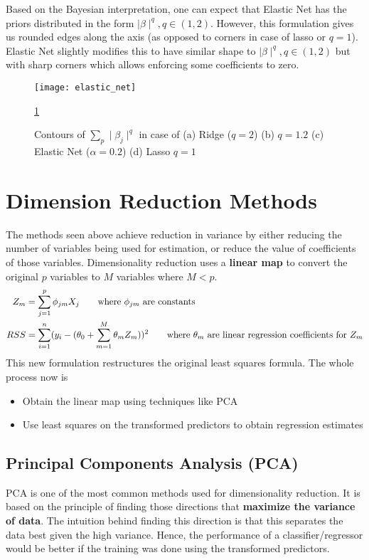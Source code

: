 \documentclass[../statistical_learning_notes.tex]{subfiles}
\begin{document}
    Based on the Bayesian interpretation, one can expect that Elastic Net has the priors distributed in the form $\mid \beta \mid ^{q}, q \in (1,2)$. However, this formulation gives us rounded edges along the axis (as opposed to corners in case of lasso or $q=1$). Elastic Net slightly modifies this to have similar shape to $\mid \beta \mid ^{q}, q \in (1,2)$ but with sharp corners which allows enforcing some coefficients to zero.


    \begin{figure}[h]
        \texttt{[image: elastic\_net]}
        \centering
        \caption {Contours of $\sum_{p} \mid \beta_{j} \mid^{q}$ in case of (a) Ridge ($q=2$) (b) $q=1.2$ (c) Elastic Net ($\alpha=0.2$) (d) Lasso $q=1$}
        \label{fig:elastic_net}\ref{fig:elastic_net}
    \end{figure}


    \section{Dimension Reduction Methods}
    The methods seen above achieve reduction in variance by either reducing the number of variables being used for estimation, or reduce the value of coefficients of those variables.\newline
    Dimensionality reduction uses a \textbf{linear map} to convert the original $p$ variables to $M$ variables where $M < p$.
    \begin{align*}
        Z_{m} &= \sum_{j=1}^{p} \phi_{jm}X_{j} \tag*{where $\phi_{jm}$ are constants} \\
        RSS &= \sum_{i=1}^{n} (y_{i} - (\theta_{0}+\sum_{m=1}^{M}\theta_{m}Z_{m}))^{2} \tag*{where $\theta_{m}$ are linear regression coefficients for $Z_{m}$}
    \end{align*}
    This new formulation restructures the original least squares formula. The whole process now is
    \begin{itemize}
        \item Obtain the linear map using techniques like PCA
        \item Use least squares on the transformed predictors to obtain regression estimates
    \end{itemize}


    \subsection{Principal Components Analysis (PCA)}
    PCA is one of the most common methods used for dimensionality reduction. It is based on the principle of finding those directions that \textbf{maximize the variance of data}. The intuition behind finding this direction is that this separates the data best given the high variance. Hence, the performance of a classifier/regressor would be better if the training was done using the transformed predictors. \newline
\end{document}
